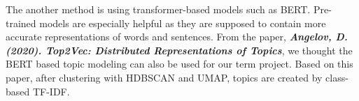 The another method is using transformer-based models such as BERT. Pre-trained models are especially helpful as they are supposed to contain more accurate representations of words and sentences. From the paper, \textbf{\textit{Angelov, D. (2020). Top2Vec: Distributed Representations of Topics}}, we thought the BERT based topic modeling can also be used for our term project. Based on this paper, after clustering with HDBSCAN and UMAP, topics are created by class-based TF-IDF.